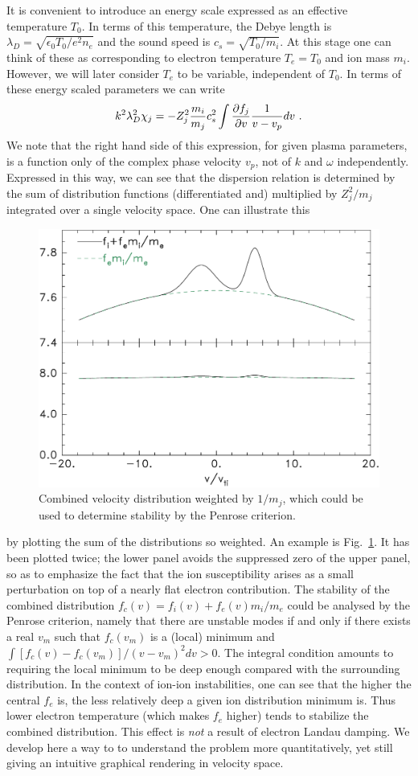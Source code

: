 \documentclass[12pt]{article}
\begin{document}
It is convenient to introduce an energy scale expressed as an
effective temperature $T_0$. In terms of this temperature, the Debye
length is $\lambda_{D} = \sqrt{\epsilon_0 T_0/e^2 n_e}$ and the sound
speed is $c_{s} = \sqrt{T_0/m_i}$. At this stage one can think of these as
corresponding to electron temperature $T_e=T_0$ and ion mass
$m_i$. However, we will later consider $T_e$ to be variable,
independent of $T_0$. In terms of these energy scaled parameters we
can write
\begin{equation}\label{ionint}
  k^2\lambda_{D}^2 \chi_j = -  Z_j^2 {m_i\over m_j} c_{s}^2 \int  {\partial
    f_j\over \partial v } {1\over v- v_p} dv\ .
\end{equation}
We note that the right hand side of this expression, for given plasma
parameters, is a function only of the complex phase velocity $v_p$,
not of $k$ and $\omega$ independently. Expressed in this way, we can
see that the dispersion relation is determined by the sum of
distribution functions (differentiated and) multiplied by $Z_j^2/m_j$
integrated over a single velocity space. One can illustrate this
\begin{figure}[htp]
  \centering
  \includegraphics[width=0.6\hsize]{combined}
  \caption{Combined velocity distribution weighted by $1/m_j$, which
    could be used to determine stability by the Penrose criterion.}
  \label{fig:penrose}
\end{figure}
by plotting the sum of the distributions so weighted. An example is
Fig.\ \ref{fig:penrose}. It has been plotted twice; the lower panel
avoids the suppressed zero of the upper panel, so as to emphasize the
fact that the ion susceptibility arises as a small perturbation on top
of a nearly flat electron contribution. The stability of the combined
distribution $f_c(v)=f_i(v)+ f_e(v)m_i/m_e$ could be analysed by the
Penrose criterion, namely that there are unstable modes if and only if
there exists a real $v_m$ such that $f_c(v_m)$ is a (local)
minimum and $\int[f_c(v)-f_c(v_m)]/(v-v_m)^2 dv>0$. The integral
condition amounts to requiring the local minimum to be deep enough
compared with the surrounding distribution. In the context of ion-ion
instabilities, one can see that the higher the central $f_e$ is, the
less relatively deep a given ion distribution minimum is. Thus lower
electron temperature (which makes $f_e$ higher) tends to stabilize the
combined distribution. This effect is \emph{not} a result of electron Landau
damping.  We develop here a way to to understand the problem more
quantitatively, yet still giving an intuitive graphical rendering in
velocity space.
\end{document}
